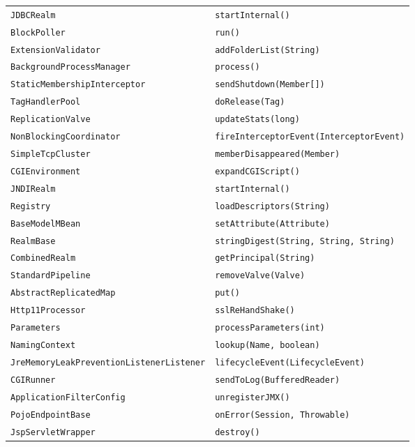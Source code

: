 \begin{center}
\begin{longtable}{ll}
\lstinline/JDBCRealm/&{\lstinline/startInternal()/}\\
\lstinline/BlockPoller/&{\lstinline/run()/}\\
\lstinline/ExtensionValidator/&{\lstinline/addFolderList(String)/}\\
\lstinline/BackgroundProcessManager/&{\lstinline/process()/}\\
\lstinline/StaticMembershipInterceptor/&{\lstinline/sendShutdown(Member[])/}\\
\lstinline/TagHandlerPool/&{\lstinline/doRelease(Tag)/}\\
\lstinline/ReplicationValve/&{\lstinline/updateStats(long)/}\\
\lstinline/NonBlockingCoordinator/&{\lstinline/fireInterceptorEvent(InterceptorEvent)/}\\
\lstinline/SimpleTcpCluster/&{\lstinline/memberDisappeared(Member)/}\\
\lstinline/CGIEnvironment/&{\lstinline/expandCGIScript()/}\\
\lstinline/JNDIRealm/&{\lstinline/startInternal()/}\\
\lstinline/Registry/&{\lstinline/loadDescriptors(String)/}\\
\lstinline/BaseModelMBean/&{\lstinline/setAttribute(Attribute)/}\\
\lstinline/RealmBase/&{\lstinline/stringDigest(String, String, String)/}\\
\lstinline/CombinedRealm/&{\lstinline/getPrincipal(String)/}\\
\lstinline/StandardPipeline/&{\lstinline/removeValve(Valve)/}\\
\lstinline/AbstractReplicatedMap/&{\lstinline/put()/}\\
\lstinline/Http11Processor/&{\lstinline/sslReHandShake()/}\\
\lstinline/Parameters/&{\lstinline/processParameters(int)/}\\
\lstinline/NamingContext/&{\lstinline/lookup(Name, boolean)/}\\
\lstinline/JreMemoryLeakPreventionListenerListener/&{\lstinline/lifecycleEvent(LifecycleEvent)/}\\
\lstinline/CGIRunner/&{\lstinline/sendToLog(BufferedReader)/}\\
\lstinline/ApplicationFilterConfig/&{\lstinline/unregisterJMX()/}\\
\lstinline/PojoEndpointBase/&{\lstinline/onError(Session, Throwable)/}\\
\lstinline/JspServletWrapper/&{\lstinline/destroy()/}\\

\end{longtable}
\end{center}
